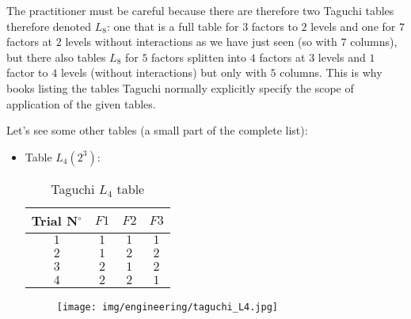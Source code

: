 	\begin{tcolorbox}[title=Remark,colframe=black,arc=10pt]
	The practitioner must be careful because there are therefore two Taguchi tables therefore denoted $L_8$: one that is a full table for $3$ factors to $2$ levels and one for $7$ factors at $2$ levels without interactions as we have just seen (so with $7$ columns), but there also tables $L_8$ for $5$ factors splitten into $4$ factors at $3$ levels and $1$ factor to $4$ levels (without interactions) but only with $5$ columns. This is why books listing the tables Taguchi normally explicitly specify the scope of application of the given tables.
	\end{tcolorbox}
	Let's see some other tables (a small part of the complete list):
	\begin{itemize}
		\item Table $L_4 (2^3)$:
		\begin{table}[H]\centering
			\begin{center}
					\begin{tabular}{|c|c|c|c|}
						\hline
						\multicolumn{1}{c}{\cellcolor{black!30}\textbf{Trial N${}^\circ$}} & 
		  \multicolumn{1}{c}{\cellcolor{black!30}$F1$} & 
		  \multicolumn{1}{c}{\cellcolor{black!30}$F2$} & 
		  \multicolumn{1}{c}{\cellcolor{black!30}$F3$} \\ \hline
						$1$ & $1$ & $1$ & $1$\\ \hline
						$2$ & $1$ & $2$ & $2$\\ \hline
						$3$ & $2$ & $1$ & $2$\\ \hline
						$4$ & $2$ & $2$ & $1$\\ \hline
		 		\end{tabular}
			\end{center}
			\caption{Taguchi $L_4$ table}
		\end{table}
		\begin{figure}[H]
			\begin{center}
			\texttt{[image: img/engineering/taguchi\_L4.jpg]}
			\end{center}	
		\end{figure}
		

\end{itemize}

